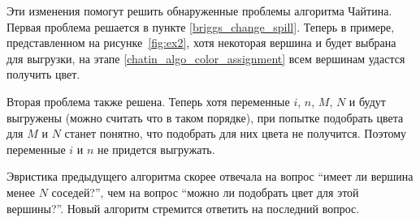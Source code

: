 Эти изменения помогут решить обнаруженные проблемы алгоритма Чайтина. Первая проблема решается в пункте \ref{briggs_change_spill}.
Теперь в примере, представленном на рисунке~\ref{fig:ex2}, хотя некоторая вершина и будет выбрана для выгрузки, на этапе \ref{chatin_algo_color_assignment}
всем вершинам удастся получить цвет.

Вторая проблема также решена. Теперь хотя переменные $i$, $n$, $M$, $N$ и будут выгружены (можно считать что в таком
порядке), при попытке подобрать цвета для $M$ и $N$ станет понятно, что подобрать для них цвета не получится.
Поэтому переменные $i$ и $n$ не придется выгружать.

Эвристика предыдущего алгоритма скорее отвечала на
вопрос ``имеет ли вершина менее $N$ соседей?'', чем на вопрос ``можно ли подобрать цвет для этой вершины?''.
Новый алгоритм стремится ответить на последний вопрос.
